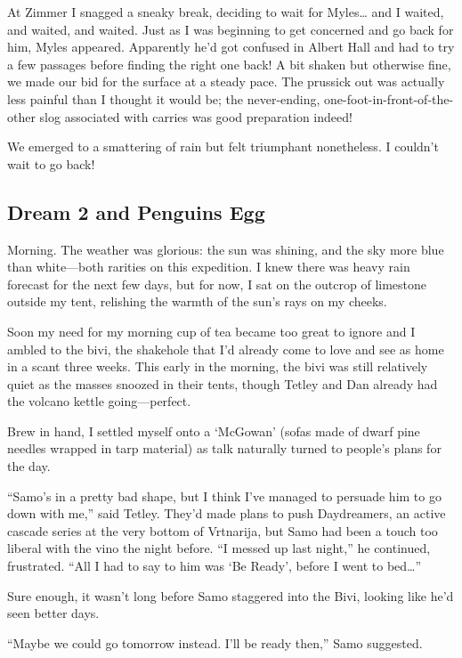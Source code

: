 At Zimmer I snagged a sneaky break, deciding to wait for Myles\ldots{}
and I waited, and waited, and waited. Just as I was beginning to get
concerned and go back for him, Myles appeared. Apparently he'd got
confused in Albert Hall and had to try a few passages before finding the
right one back! A bit shaken but otherwise fine, we made our bid for the
surface at a steady pace. The prussick out was actually less painful
than I thought it would be; the never-ending,
one-foot-in-front-of-the-other slog associated with carries was good
preparation indeed!

We emerged to a smattering of rain but felt triumphant nonetheless. I
couldn't wait to go back!


\subsection{Dream 2 and Penguins Egg}\label{dream-2-and-penguins-egg}

Morning. The weather was glorious: the sun was shining, and the sky more
blue than white---both rarities on this expedition. I knew there was
heavy rain forecast for the next few days, but for now, I sat on the
outcrop of limestone outside my tent, relishing the warmth of the sun's
rays on my cheeks.

Soon my need for my morning cup of tea became too great to ignore and I
ambled to the bivi, the shakehole that I'd already come to love and see
as home in a scant three weeks. This early in the morning, the bivi was
still relatively quiet as the masses snoozed in their tents, though
Tetley and Dan already had the volcano kettle going---perfect.

Brew in hand, I settled myself onto a `McGowan' (sofas made of dwarf
pine needles wrapped in tarp material) as talk naturally turned to
people's plans for the day.

``Samo's in a pretty bad shape, but I think I've managed to persuade him
to go down with me,'' said Tetley. They'd made plans to push
Daydreamers, an active cascade series at the very bottom of Vrtnarija,
but Samo had been a touch too liberal with the vino the night before.
``I messed up last night,'' he continued, frustrated. ``All I had to say
to him was `Be Ready', before I went to bed\ldots{}''

Sure enough, it wasn't long before Samo staggered into the Bivi, looking
like he'd seen better days.

``Maybe we could go tomorrow instead. I'll be ready then,'' Samo
suggested.


